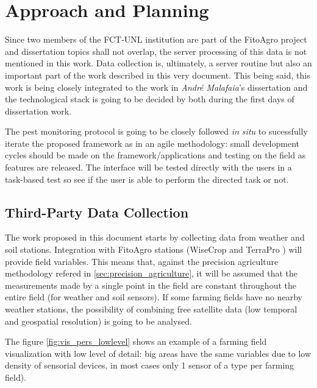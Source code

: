 \chapter{Approach and Planning}
\label{cha:approach_and_planning}

Since two members of the FCT-UNL institution are part of the FitoAgro project and dissertation topics shall not overlap, the server processing of this data is not mentioned in this work. Data collection is, ultimately, a server routine but also an important part of the work described in this very document. This being said, this work is being closely integrated to the work in \emph{André Malafaia}'s dissertation and the technological stack is going to be decided by both during the first days of dissertation work.

The pest monitoring protocol is going to be closely followed \textit{in situ} to sucessfully iterate the proposed framework as in an agile methodology: small development cycles should be made on the framework/applications and testing on the field as features are released. The interface will be tested directly with the users in a task-based test so see if the user is able to perform the directed task or not. 

\section{Third-Party Data Collection}

The work proposed in this document starts by collecting data from weather and soil stations. Integration with FitoAgro stations (WiseCrop \cite{wisecrop} and TerraPro \cite{terrapro}) will provide field variables. This means that, against the precision agriculture methodology refered in \ref{sec:precision_agriculture}, it will be assumed that the measurements made by a single point in the field are constant throughout the entire field (for weather and soil sensors). If some farming fields have no nearby weather stations, the possibility of combining free satellite data (low temporal and geospatial resolution) is going to be analysed.

The figure \ref{fig:vis_pers_lowlevel} shows an example of a farming field visualization with low level of detail: big areas have the same variables due to low density of sensorial devices, in most cases only 1 sensor of a type per farming field). 

